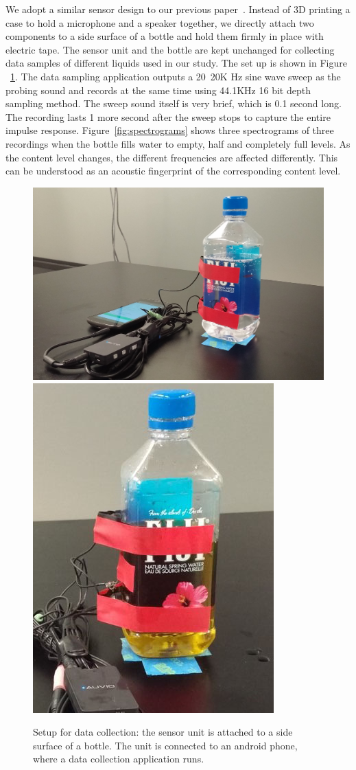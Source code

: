 \documentclass{article} %
\begin{document}
We adopt a similar sensor design to our previous paper~\cite{fan2015soqr}. Instead of 3D printing a case to hold a microphone and a speaker together, we directly attach two components to a side surface of a bottle and hold them firmly in place with electric tape. The sensor unit and the bottle are kept unchanged for collecting data samples of different liquids used in our study. The set up is shown in Figure ~\ref{fig:set-up}. The data sampling application outputs a 20~20K Hz sine wave sweep as the probing sound and records at the same time using 44.1KHz 16 bit depth sampling method. The sweep sound itself is very brief, which is 0.1 second long. The recording lasts 1 more second after the sweep stops to capture the entire impulse response. Figure~\ref{fig:spectrograms} shows three spectrograms of three recordings when the bottle fills water to empty, half and completely full levels. As the content level changes, the different frequencies are affected differently. This can be understood as an acoustic fingerprint of the corresponding content level.
\begin{figure}
\centering
  \includegraphics[width=0.5\linewidth]{setup1.jpg}
  \includegraphics[width=0.242\linewidth]{setup2.jpg}
  \caption{Setup for data collection: the sensor unit is attached to a side surface of a bottle. The unit is connected to an android phone, where a data collection application runs.}
  \label{fig:set-up}
\end{figure}
\end{document}
